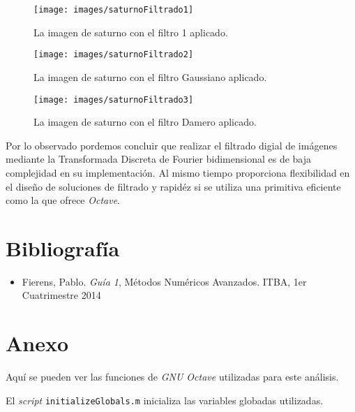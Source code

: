 \documentclass{article}
\begin{document}
\begin{multicols}{2}
\begin{figure}[H]
\centering
\texttt{[image: images/saturnoFiltrado1]}
\caption{La imagen de saturno con el filtro 1 aplicado.}
\label{saturnoFilter1}
\end{figure}

\begin{figure}[H]
\centering
\texttt{[image: images/saturnoFiltrado2]}
\caption{La imagen de saturno con el filtro Gaussiano aplicado.}
\label{saturnoFilter2}
\end{figure}

\begin{figure}[H]
\centering
\texttt{[image: images/saturnoFiltrado3]}
\caption{La imagen de saturno con el filtro Damero aplicado.}
\label{saturnoFilter3}
\end{figure}


\par Por lo observado pordemos concluir que realizar el filtrado digial de imágenes mediante la Transformada Discreta de Fourier bidimensional es de baja complejidad en su implementación. Al mismo tiempo proporciona flexibilidad en el diseño de soluciones de filtrado y rapidéz si se utiliza una primitiva eficiente como la que ofrece \textit{Octave}.\\

\end{multicols}

\section{Bibliografía} 

\begin{itemize}
  \item Fierens, Pablo. \textit{Guía 1}, Métodos Numéricos Avanzados. ITBA, 1er Cuatrimestre 2014

\end{itemize}

\clearpage

\section{Anexo}
\par Aquí se pueden ver las funciones de \textit{GNU Octave} utilizadas para este análisis.\\

\par El \textit{script} \verb+initializeGlobals.m+ inicializa las variables globadas utilizadas.
\end{document}
